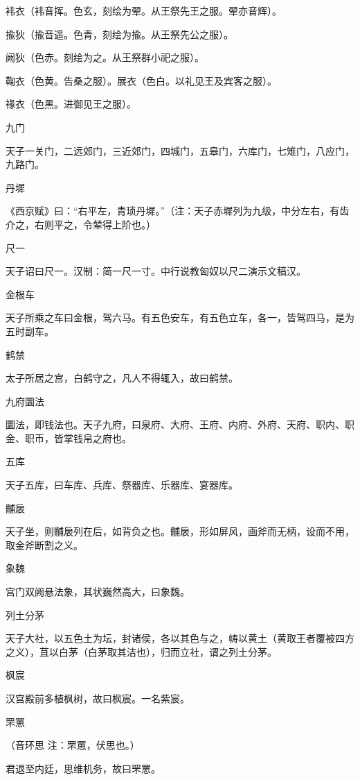 \documentclass[a4paper,12pt,UTF8,twoside]{ctexbook}
\begin{document}
    袆衣（袆音挥。色玄，刻绘为翚。从王祭先王之服。翚亦音辉）。
    
    揄狄（揄音遥。色青，刻绘为揄。从王祭先公之服）。
    
    阙狄（色赤。刻绘为之。从王祭群小祀之服）。
    
    鞠衣（色黄。告桑之服）。展衣（色白。以礼见王及宾客之服）。
    
    禒衣（色黑。进御见王之服）。
    
    九门
    
    天子一关门，二远郊门，三近郊门，四城门，五皋门，六库门，七雉门，八应门，九路门。
    
    丹墀
    
    《西京赋》曰：“右平左，青琐丹墀。”（注：天子赤墀列为九级，中分左右，有齿介之，右则平之，令辇得上阶也。）
    
    尺一
    
    天子诏曰尺一。汉制：简一尺一寸。中行说教匈奴以尺二演示文稿汉。
    
    金根车
    
    天子所乘之车曰金根，驾六马。有五色安车，有五色立车，各一，皆驾四马，是为五时副车。
    
    鹤禁
    
    太子所居之宫，白鹤守之，凡人不得辄入，故曰鹤禁。
    
    九府圜法
    
    圜法，即钱法也。天子九府，曰泉府、大府、王府、内府、外府、天府、职内、职金、职币，皆掌钱帛之府也。
    
    五库
    
    天子五库，曰车库、兵库、祭器库、乐器库、宴器库。
    
    黼扆
    
    天子坐，则黼扆列在后，如背负之也。黼扆，形如屏风，画斧而无柄，设而不用，取金斧断割之义。
    
    象魏
    
    宫门双阙悬法象，其状巍然高大，曰象魏。
    
    列土分茅
    
    天子大社，以五色土为坛，封诸侯，各以其色与之，帱以黄土（黄取王者覆被四方之义），苴以白茅（白茅取其洁也），归而立社，谓之列土分茅。
    
    枫宸
    
    汉宫殿前多植枫树，故曰枫宸。一名紫宸。
    
    罘罳
    
    （音环思 注：罘罳，伏思也。）
    
    君退至内廷，思维机务，故曰罘罳。
    
\end{document}
